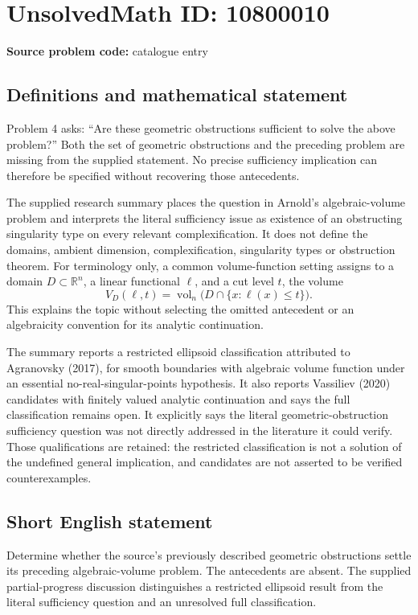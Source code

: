 \documentclass[11pt]{article}
\newcommand{\R}{\mathbb{R}}
\begin{document}
\section*{UnsolvedMath ID: 10800010}
\textbf{Source problem code:} catalogue entry
\subsection{Definitions and mathematical statement}
Problem 4 asks: ``Are these geometric obstructions sufficient to solve the above problem?'' Both the set of geometric obstructions and the preceding problem are missing from the supplied statement. No precise sufficiency implication can therefore be specified without recovering those antecedents.

The supplied research summary places the question in Arnold's algebraic-volume problem and interprets the literal sufficiency issue as existence of an obstructing singularity type on every relevant complexification. It does not define the domains, ambient dimension, complexification, singularity types or obstruction theorem. For terminology only, a common volume-function setting assigns to a domain \(D\subset\R^n\), a linear functional \(\ell\), and a cut level \(t\), the volume
\[
 V_D(\ell,t)=\operatorname{vol}_n\bigl(D\cap\{x:\ell(x)\le t\}\bigr).
\]
This explains the topic without selecting the omitted antecedent or an algebraicity convention for its analytic continuation.

The summary reports a restricted ellipsoid classification attributed to Agranovsky (2017), for smooth boundaries with algebraic volume function under an essential no-real-singular-points hypothesis. It also reports Vassiliev (2020) candidates with finitely valued analytic continuation and says the full classification remains open. It explicitly says the literal geometric-obstruction sufficiency question was not directly addressed in the literature it could verify. Those qualifications are retained: the restricted classification is not a solution of the undefined general implication, and candidates are not asserted to be verified counterexamples.
\subsection{Short English statement}
Determine whether the source's previously described geometric obstructions settle its preceding algebraic-volume problem. The antecedents are absent. The supplied partial-progress discussion distinguishes a restricted ellipsoid result from the literal sufficiency question and an unresolved full classification.
\end{document}
